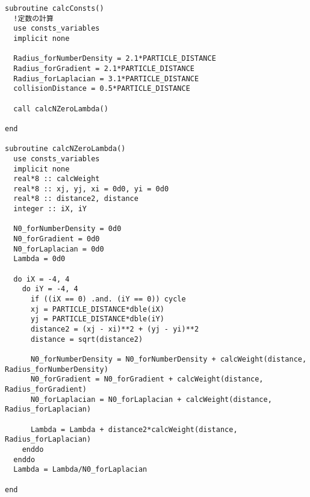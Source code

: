 \begin{lstlisting}[caption=定数計算関連ルーチン]
subroutine calcConsts()
  !定数の計算
  use consts_variables
  implicit none

  Radius_forNumberDensity = 2.1*PARTICLE_DISTANCE
  Radius_forGradient = 2.1*PARTICLE_DISTANCE
  Radius_forLaplacian = 3.1*PARTICLE_DISTANCE
  collisionDistance = 0.5*PARTICLE_DISTANCE

  call calcNZeroLambda()

end

subroutine calcNZeroLambda()
  use consts_variables
  implicit none
  real*8 :: calcWeight
  real*8 :: xj, yj, xi = 0d0, yi = 0d0
  real*8 :: distance2, distance
  integer :: iX, iY

  N0_forNumberDensity = 0d0
  N0_forGradient = 0d0
  N0_forLaplacian = 0d0
  Lambda = 0d0

  do iX = -4, 4
    do iY = -4, 4
      if ((iX == 0) .and. (iY == 0)) cycle
      xj = PARTICLE_DISTANCE*dble(iX)
      yj = PARTICLE_DISTANCE*dble(iY)
      distance2 = (xj - xi)**2 + (yj - yi)**2
      distance = sqrt(distance2)

      N0_forNumberDensity = N0_forNumberDensity + calcWeight(distance, Radius_forNumberDensity)
      N0_forGradient = N0_forGradient + calcWeight(distance, Radius_forGradient)
      N0_forLaplacian = N0_forLaplacian + calcWeight(distance, Radius_forLaplacian)

      Lambda = Lambda + distance2*calcWeight(distance, Radius_forLaplacian)
    enddo
  enddo
  Lambda = Lambda/N0_forLaplacian

end
\end{lstlisting}